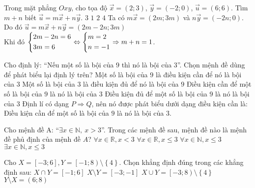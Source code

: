 \begin{ex}%
Trong mặt phẳng $Oxy$, cho tọa độ $\vec{x}=(2;3 )$, $\vec{y}=(-2;0 )$, $\vec{u}=(6;6 )$. Tìm $m+n$ biết $\vec{u}=m\vec{x}+n\vec{y}$.
\choice
{$3$}
{\True $1$}
{$2$}
{$4$}
\loigiai
{Ta có $m\vec{x}=(2m;3m )$ và $n\vec{y}=(-2n;0 )$.\\
	Do đó $\vec{u}=m\vec{x}+n\vec{y}=(2m-2n;3m )$\\
	Khi đó $\left\{\begin{aligned}& 2m-2n=6 \\
		& 3m=6 \\
	\end{aligned}\right.\Leftrightarrow \left\{\begin{aligned}& m=2 \\
		& n=-1 \\
	\end{aligned}\right.\Rightarrow m+n=1$.}
\end{ex}
\begin{ex}%
Cho định lý: ``Nếu một số là bội của $9$ thì nó là bội của $3$''. Chọn mệnh đề dùng để phát biểu lại định lý trên?
\choice
{Một số là bội của $9$ là điều kiện cần để nó là bội của $3$}
{ Một số là bội của $3$ là điều kiện đủ để nó là bội của $9$}
{ \True Điều kiện cần để một số là bội của $9$ là nó là bội của $3$}
{ Điều kiện đủ để một số là bội của $9$ là nó là bội của $3$}
\loigiai
{Định lí có dạng $P\Rightarrow Q$, nên nó được phát biểu dưới dạng điều kiện cần là:\\
	Điều kiện cần để một số là bội của $9$ là nó là bội của $3$.}
\end{ex}
\begin{ex}%
Cho mệnh đề A: ``$\exists x\in \mathbb{N},\ x>3$''. Trong các mệnh đề sau, mệnh đề nào là mệnh đề phủ định của mệnh đề $A$?
\choice
{$\forall x\in \mathbb{R},x<3$}
{$\forall x\in \mathbb{R},x\le 3$}
{\True $\forall x\in \mathbb{N},x\le 3$}
{$\exists x\in \mathbb{N},x\le 3$}
\loigiai {}
\end{ex}
\begin{ex} %
Cho $X=\left[ -3;6 \right],Y=\left[ -1;8 \right)\setminus \left\{ 4 \right\}$. Chọn khẳng định đúng trong các khẳng định sau:
\choice
{$X\cap Y=\left[ -1;6 \right]$}
{$X\setminus Y=\left[ -3;-1 \right]$}
 { $X\cup Y=\left[ -3;8 \right)\setminus \left\{ 4 \right\}$}
{\True $Y\setminus X=(6;8 )$}
\loigiai {}
\end{ex}
